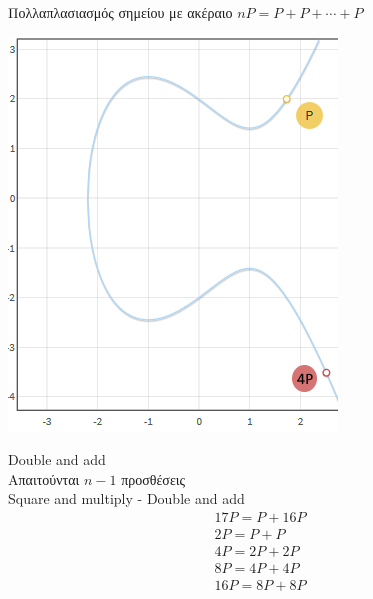 \documentclass[handout]{beamer}
\begin{document}
\begin{frame}{Πολλαπλασιασμός σημείου με ακέραιο $nP = P + P + \cdots + P$}
\begin{center}
\pause
\includegraphics[scale=0.33]{4p.png} 
\end{center}
\end{frame}

\begin{frame}{Double and add}
 \\
Απαιτούνται $n-1$ προσθέσεις \\ 

 Square and multiply - Double and add
\begin{align*}
17P = P + 16P \\
2P = P+P \\
4P= 2P+2P \\
8P= 4P+4P \\
16P= 8P+8P \\
\end{align*}
 
\end{frame}
\end{document}
